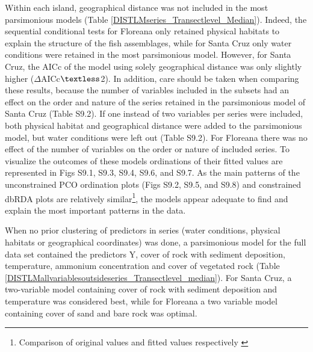 Within each island, geographical distance was not included in the most parsimonious models (Table \ref{DISTLMseries_Transectlevel_Median}). Indeed, the sequential conditional tests for Floreana only retained physical habitats to explain the structure of the fish assemblages, while for Santa Cruz only water conditions were retained in the most parsimonious model. However, for Santa Cruz, the AICc of the model using solely geographical distance was only slightly higher ($\Delta$AICc$\textless$2). In addition, care should be taken when comparing these results, because the number of variables included in the subsets had an effect on the order and nature of the series retained in the parsimonious model of Santa Cruz (Table S9.2). If one instead of two variables per series were included, both physical habitat and geographical distance were added to the parsimonious model, but water conditions were left out (Table S9.2). For Floreana there was no effect of the number of variables on the order or nature of included series. To visualize the outcomes of these models ordinations of their fitted values are represented in Figs S9.1, S9.3, S9.4, S9.6, and S9.7. As the main patterns of the unconstrained PCO ordination plots (Figs S9.2, S9.5, and S9.8) and constrained dbRDA plots are relatively similar\footnote{Comparison of original values and fitted values respectively \citep{Anderson2008PERMANOVA+Methods}}, the models appear adequate to find and explain the most important patterns in the data. 

When no prior clustering of predictors in series (water conditions, physical habitats or geographical coordinates) was done, a parsimonious model for the full data set contained the predictors Y, cover of rock with sediment deposition, temperature, ammonium concentration and cover of vegetated rock (Table \ref{DISTLMallvariablesoutsideseries_Transectlevel_median}). For Santa Cruz, a two-variable model containing cover of rock with sediment deposition and temperature was considered best, while for Floreana a two variable model containing cover of sand and bare rock was optimal.







\FloatBarrier